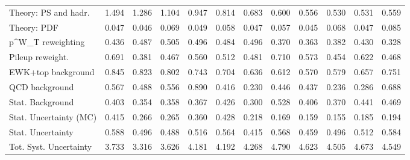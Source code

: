 \begin{tabular}{l|p{0.6cm}p{0.6cm}p{0.6cm}p{0.6cm}p{0.6cm}p{0.6cm}p{0.6cm}p{0.6cm}p{0.6cm}p{0.6cm}p{0.6cm}}
Theory: PS and hadr.                     & 1.494 & 1.286 & 1.104 & 0.947 & 0.814 & 0.683 & 0.600 & 0.556 & 0.530 & 0.531 & 0.559 \\
Theory: PDF                              & 0.047 & 0.046 & 0.069 & 0.049 & 0.058 & 0.047 & 0.057 & 0.045 & 0.068 & 0.047 & 0.085 \\
p^{W}_{T} reweighting                    & 0.436 & 0.487 & 0.505 & 0.496 & 0.484 & 0.496 & 0.370 & 0.363 & 0.382 & 0.430 & 0.328 \\
Pileup reweight.                         & 0.691 & 0.381 & 0.467 & 0.560 & 0.512 & 0.481 & 0.710 & 0.573 & 0.454 & 0.622 & 0.468 \\
EWK+top background                       & 0.845 & 0.823 & 0.802 & 0.743 & 0.704 & 0.636 & 0.612 & 0.570 & 0.579 & 0.657 & 0.751 \\
QCD background                           & 0.567 & 0.488 & 0.556 & 0.890 & 0.416 & 0.230 & 0.446 & 0.437 & 0.236 & 0.286 & 0.688 \\
Stat. Background                         & 0.403 & 0.354 & 0.358 & 0.367 & 0.426 & 0.300 & 0.528 & 0.406 & 0.370 & 0.441 & 0.469 \\
Stat. Uncertainty (MC)                   & 0.415 & 0.266 & 0.265 & 0.360 & 0.428 & 0.218 & 0.169 & 0.159 & 0.155 & 0.185 & 0.194 \\
\hline
Stat. Uncertainty                        & 0.588 & 0.496 & 0.488 & 0.516 & 0.564 & 0.415 & 0.568 & 0.459 & 0.496 & 0.512 & 0.584 \\
\hline
Tot. Syst. Uncertainty                   & 3.733 & 3.316 & 3.626 & 4.181 & 4.192 & 4.268 & 4.790 & 4.623 & 4.505 & 4.673 & 4.549 \\
\hline
\end{tabular}
